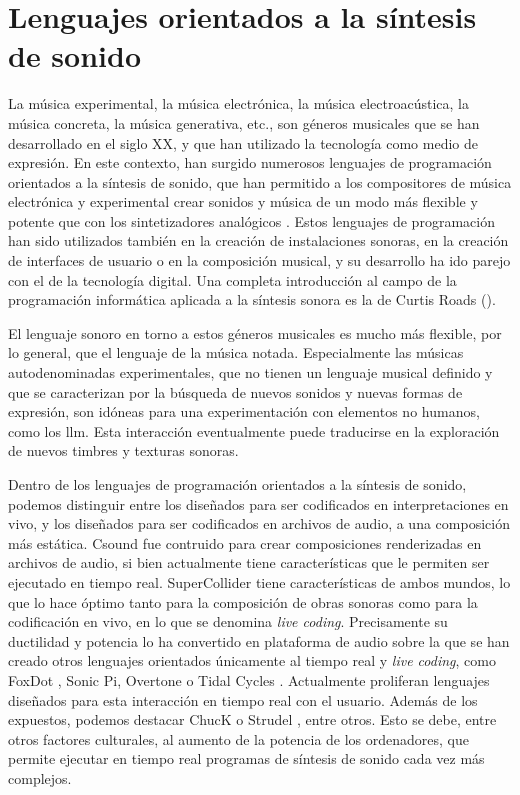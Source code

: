 \section{Lenguajes orientados a la síntesis de sonido}

La música experimental, la música electrónica, la música electroacústica, la música concreta, la música generativa, etc., son géneros musicales que se han desarrollado en el siglo XX, y que han utilizado la tecnología como medio de expresión. En este contexto, han surgido numerosos lenguajes de programación orientados a la síntesis de sonido, que han permitido a los compositores de música electrónica y experimental crear sonidos y música de un modo más flexible y potente que con los sintetizadores analógicos . Estos lenguajes de programación han sido utilizados también en la creación de instalaciones sonoras, en la creación de interfaces de usuario o en la composición musical, y su desarrollo ha ido parejo con el de la tecnología digital. Una completa introducción al campo de la programación informática aplicada a la síntesis sonora es la de Curtis Roads (\citeyear{roadsComputerMusicTutorial1996}).

El lenguaje sonoro en torno a estos géneros musicales es mucho más flexible, por lo general, que el lenguaje de la música notada. Especialmente las músicas autodenominadas experimentales, que no tienen un lenguaje musical definido y que se caracterizan por la búsqueda de nuevos sonidos y nuevas formas de expresión, son idóneas para una experimentación con elementos no humanos, como los \gls{llm}. Esta interacción eventualmente puede traducirse en la exploración de nuevos timbres y texturas sonoras.

Dentro de los lenguajes de programación orientados a la síntesis de sonido, podemos distinguir entre los diseñados para ser codificados en interpretaciones en vivo, y los diseñados para ser codificados en archivos de audio, a una composición más estática. {Csound} \citep{boulangerCsoundBookPerspectives2000} fue contruido para crear composiciones renderizadas en archivos de audio, si bien actualmente tiene características que le permiten ser ejecutado en tiempo real. {SuperCollider} \citep{wilsonSuperColliderBook2011a} tiene características de ambos mundos, lo que lo hace óptimo tanto para la composición de obras sonoras como para la codificación en vivo, en lo que se denomina \emph{live coding}. Precisamente su ductilidad y potencia lo ha convertido en plataforma de audio sobre la que se han creado otros lenguajes orientados únicamente al tiempo real y \emph{live coding}, como {FoxDot} \citep{kirkbrideQirkyFoxDot2023}, {Sonic Pi}, {Overtone} \citep{OvertoneCollaborativeProgrammable} o {Tidal Cycles} \citep{TidalCycles}. Actualmente proliferan lenguajes diseñados para esta interacción en tiempo real con el usuario. Además de los expuestos, podemos destacar {ChucK} \citep{teamChucKStronglyTimedMusic} o {Strudel} \citep{StrudelREPL}, entre otros. Esto se debe, entre otros factores culturales, al aumento de la potencia de los ordenadores, que permite ejecutar en tiempo real programas de síntesis de sonido cada vez más complejos.

